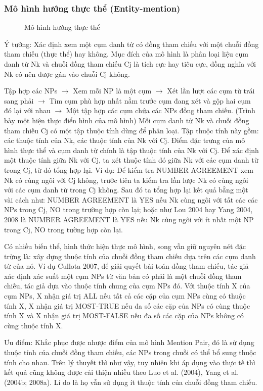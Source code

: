\documentclass[12pt]{extarticle}
\begin{document}
			\subsubsection*{Mô hình hướng thực thể (Entity-mention)}
				\begin{figure}[H]
					\centering
					
					\caption{Mô hình hướng thực thể}
				\end{figure}
				\par Ý tưởng: Xác định xem một cụm danh từ có đồng tham chiếu với một chuỗi đồng tham chiếu (thực thể) hay không. Mục đích của mô hình là phân loại liệu cụm danh từ Nk và chuỗi đồng tham chiếu Cj là tích cực hay tiêu cực, đồng nghĩa với Nk có nên được gán vào chuỗi Cj không.
				\par Tập hợp các NPs $\rightarrow$ Xem mỗi NP là một cụm $\rightarrow$ Xét lần lượt các cụm từ trái sang phải $\rightarrow$ Tìm cụm phù hợp nhất nằm trước cụm đang xét và gộp hai cụm đó lại với nhau $\rightarrow$ Một tập hợp các cụm chứa các NPs đồng tham chiếu. (Trình bày một hiện thực điển hình của mô hình)
				Mỗi cụm danh từ Nk và chuỗi đồng tham chiếu Cj có một tập thuộc tính dùng để phân loại. Tập thuộc tính này gồm: các thuộc tính của Nk, các thuộc tính của Nk với Cj. Điểm đặc trưng của mô hình thực thể và cụm danh từ chính là tập thuộc tính của Nk với Cj. Để xác định một thuộc tính giữa Nk với Cj, ta xét thuộc tính đó giữa Nk với các cụm danh từ trong Cj, từ đó tổng hợp lại. Ví dụ: Để kiểm tra NUMBER AGREEMENT xem Nk có cùng ngôi với Cj không, trước tiên ta kiểm tra lần lược Nk có cùng ngôi với các cụm danh từ trong Cj không. Sau đó ta tổng hợp lại kết quả bằng một vài cách như: NUMBER AGREEMENT là YES nếu Nk cùng ngôi với tất các các NPs trong Cj, NO trong trường hợp còn lại; hoặc như Lou 2004 hay Yang 2004, 2008 là NUMBER AGREEMENT là YES nếu Nk cùng ngôi với ít nhất một NP trong Cj, NO trong tường hợp còn lại. 
				\par Có nhiều biến thể, hình thức hiện thực mô hình, song vẫn giữ nguyên nét đặc trừng là: xây dựng thuộc tính của chuỗi đồng tham chiếu dựa trên các cụm danh từ của nó. Ví dụ Cullota 2007, để giải quyết bài toán đồng tham chiếu, tác giả xác định xác suất một cụm NPs từ văn bản có phải là một chuỗi đồng tham chiếu, tác giả dựa vào thuộc tính chung của cụm NPs đó. Với thuộc tính X của cụm NPs, X nhận giá trị ALL nếu tất cả các cặp của cụm NPs cùng có thuộc tính X, X nhận giá trị MOST-TRUE nếu đa số các cặp của NPs có cùng thuộc tính X và X nhận giá trị MOST-FALSE nếu đa số các cặp của NPs không có cùng thuộc tính X. 
				\par Ưu điểm: Khắc phục được nhược điểm của mô hình Mention Pair, đó là sử dụng thuộc tính của chuỗi đồng tham chiếu, các NPs trong chuỗi có thể bổ sung thuộc tính cho nhau. Trên lý thuyết thì như vậy, tuy nhiên khi áp dụng vào thực tế thì kết quả cũng không được cải thiện nhiều theo Luo et al. (2004), Yang et al. (2004b; 2008a). Lí do là họ vẫn sử dụng ít thuộc tính của chuỗi đồng tham chiếu.
\end{document}
